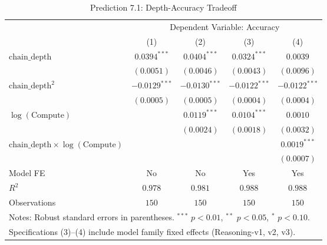 
\begin{table}[htbp]
\centering
\caption{Prediction 7.1: Depth-Accuracy Tradeoff}
\label{tab:prediction7_1}
\begin{tabular}{lcccc}
\toprule
& \multicolumn{4}{c}{Dependent Variable: Accuracy} \\
\cmidrule(lr){2-5}
& (1) & (2) & (3) & (4) \\
\midrule
$\text{chain\_depth}$ & $0.0394^{***}$ & $0.0404^{***}$ & $0.0324^{***}$ & $0.0039$ \\
            & $(0.0051)$ & $(0.0046)$ & $(0.0043)$ & $(0.0096)$ \\
$\text{chain\_depth}^2$ & $-0.0129^{***}$ & $-0.0130^{***}$ & $-0.0122^{***}$ & $-0.0122^{***}$ \\
                & $(0.0005)$ & $(0.0005)$ & $(0.0004)$ & $(0.0004)$ \\
$\log(\text{Compute})$ &  & $0.0119^{***}$ & $0.0104^{***}$ & $0.0010$ \\
             &  & $(0.0024)$ & $(0.0018)$ & $(0.0032)$ \\
$\text{chain\_depth} \times \log(\text{Compute})$ & & & & $0.0019^{***}$ \\
                                  & & & & $(0.0007)$ \\
\midrule
Model FE & No & No & Yes & Yes \\
\midrule
$R^2$ & $0.978$ & $0.981$ & $0.988$ & $0.988$ \\
Observations & $150$ & $150$ & $150$ & $150$ \\
\bottomrule
\multicolumn{5}{l}{\footnotesize{Notes: Robust standard errors in parentheses. $^{***}$ $p{<}0.01$, $^{**}$ $p{<}0.05$, $^{*}$ $p{<}0.10$.}} \\
\multicolumn{5}{l}{\footnotesize{Specifications (3)--(4) include model family fixed effects (Reasoning-v1, v2, v3).}} \\
\end{tabular}
\end{table}

